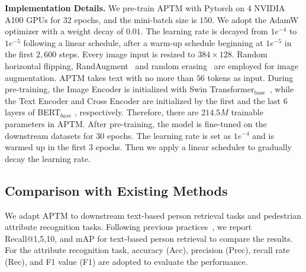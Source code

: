 \documentclass[sigconf]{acmart}
\begin{document}
\noindent\textbf{Implementation Details.}
We pre-train APTM with Pytorch on $4$ NVIDIA A100 GPUs for $32$ epochs, and the mini-batch size is $150$. 
We adopt the AdamW \cite{loshchilov2018decoupled} optimizer with a weight decay of $0.01$. 
The learning rate is decayed from $1e^{-4}$ to $1e^{-5}$ following a linear schedule, after a warm-up schedule beginning at $1e^{-5}$ in the first $2,600$ steps. 
Every image input is resized to $384 \times 128$. 
Random horizontal flipping, RandAugment~\cite{cubuk2020randaugment} and random erasing~\cite{zhong2020random} are employed for image augmentation.
APTM takes text with no more than $56$ tokens as input.
During pre-training, the Image Encoder is initialized with Swin Transformer$_{\text{base}}$~\cite{liu2021Swin}, while the Text Encoder and Cross Encoder are initialized by the first and the last $6$ layers of BERT$_{base}$ \cite{kenton2019bert}, respectively. Therefore, there are $214.5M$ trainable parameters in APTM.
After pre-training, the model is fine-tuned on the downstream datasets for $30$ epochs. 
The learning rate is set as $1e^{-4}$ and is warmed up in the first $3$ epochs.
Then we apply a linear scheduler to gradually decay the learning rate.


\subsection{Comparison with Existing Methods}
We adapt APTM to downstream text-based person retrieval tasks and pedestrian attribute recognition tasks. Following previous practices~\cite{shu2023see,yan2022clip}, we report Recall@1,5,10, and mAP for text-based person retrieval to compare the results. For the attribute recognition task, accuracy (Acc), precision (Prec), recall rate (Rec), and F1 value (F1) are adopted to evaluate the performance.
\end{document}

